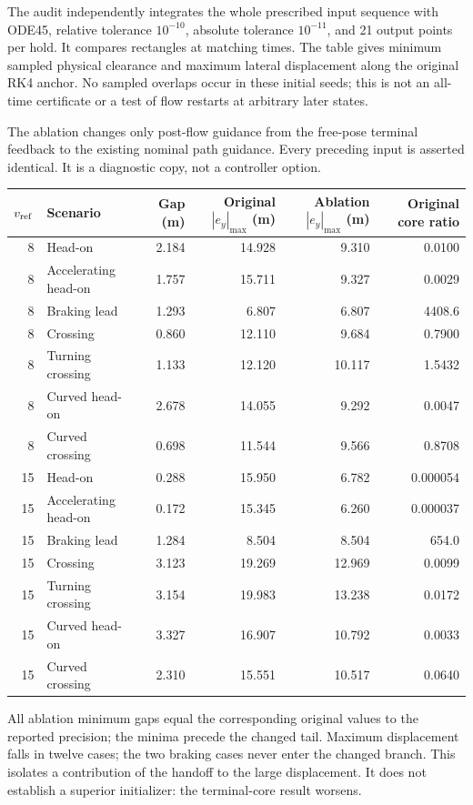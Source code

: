 \documentclass[10pt]{article}
\begin{document}
The audit independently integrates the whole prescribed input sequence with
ODE45, relative tolerance $10^{-10}$, absolute tolerance $10^{-11}$, and
21 output points per hold. It compares rectangles at matching times.
The table gives minimum sampled physical clearance and maximum lateral
displacement along the original RK4 anchor.
No sampled overlaps occur in these initial seeds; this is not an all-time
certificate or a test of flow restarts at arbitrary later states.

The ablation changes only post-flow guidance from the free-pose terminal
feedback to the existing nominal path guidance. Every preceding input is
asserted identical. It is a diagnostic copy, not a controller option.

\begin{center}
\small
\begin{tabular}{rlrrrr}
\toprule
$v_{\rm ref}$ & Scenario & Gap (m) & Original $|e_y|_{\max}$ (m)
 & Ablation $|e_y|_{\max}$ (m) & Original core ratio\\
\midrule
8 & Head-on & 2.184 & 14.928 & 9.310 & 0.0100\\
8 & Accelerating head-on & 1.757 & 15.711 & 9.327 & 0.0029\\
8 & Braking lead & 1.293 & 6.807 & 6.807 & 4408.6\\
8 & Crossing & 0.860 & 12.110 & 9.684 & 0.7900\\
8 & Turning crossing & 1.133 & 12.120 & 10.117 & 1.5432\\
8 & Curved head-on & 2.678 & 14.055 & 9.292 & 0.0047\\
8 & Curved crossing & 0.698 & 11.544 & 9.566 & 0.8708\\
15 & Head-on & 0.288 & 15.950 & 6.782 & 0.000054\\
15 & Accelerating head-on & 0.172 & 15.345 & 6.260 & 0.000037\\
15 & Braking lead & 1.284 & 8.504 & 8.504 & 654.0\\
15 & Crossing & 3.123 & 19.269 & 12.969 & 0.0099\\
15 & Turning crossing & 3.154 & 19.983 & 13.238 & 0.0172\\
15 & Curved head-on & 3.327 & 16.907 & 10.792 & 0.0033\\
15 & Curved crossing & 2.310 & 15.551 & 10.517 & 0.0640\\
\bottomrule
\end{tabular}
\end{center}

All ablation minimum gaps equal the corresponding original values to the
reported precision; the minima precede the changed tail. Maximum displacement
falls in twelve cases; the two braking cases never enter the changed branch.
This isolates a contribution of the handoff to the large displacement.
It does not establish a superior initializer: the terminal-core result worsens.
\end{document}

